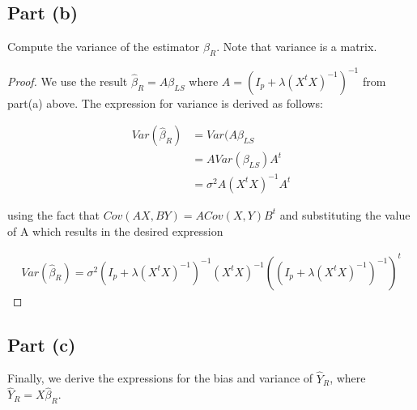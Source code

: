 \documentclass[paper=a4, fontsize=11pt]{scrartcl} %
\numberwithin{equation}{section} %
\begin{document}
\subsection*{Part (b)}

Compute the variance of the estimator $\hat{\beta}_R$. Note that variance is a matrix.

\begin{proof}

We use the result $\hat{\beta}_R = A \beta_{LS}$ where $A = (I_p + \lambda(X^t X)^{-1})^{-1}$ from part(a) above. The expression for variance is derived as follows:

\begin{align}
Var(\hat{\beta}_R) &= Var(A \beta_{LS} \\
&= A Var(\beta_{LS}) A^t \\
&= \sigma^2 A (X^t X)^{-1} A^t
\end{align}

using the fact that $Cov(AX, BY) = A Cov(X, Y) B^t$ and substituting the value of A which results in the desired expression 

\begin{align}
Var(\hat{\beta}_R) = \sigma^2 (I_p + \lambda(X^t X)^{-1})^{-1} (X^t X)^{-1} ((I_p + \lambda(X^t X)^{-1})^{-1})^t
\end{align}

\end{proof}

\subsection*{Part (c)}

Finally, we derive the expressions for the bias and variance of $\hat{Y}_R$, where $\hat{Y}_R = X \hat{\beta}_R$.
\end{document}
